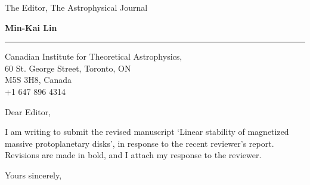 \documentclass{letter} %
\begin{document}
\signature{Min-Kai Lin}           %
\longindentation=0pt                       %
\let\raggedleft\raggedright                %
 
 
\begin{letter}{The Editor, The Astrophysical Journal}


\begin{flushleft}
{\large\bf Min-Kai Lin}
\end{flushleft}
\medskip\hrule height 1pt
\begin{flushright}
\hfill Canadian Institute for Theoretical Astrophysics, \\
\hfill 60 St. George Street, Toronto, ON \\
\hfill M5S 3H8, Canada\\
\hfill +1 647 896 4314
\end{flushright} 
\vfill %

 
\opening{Dear Editor,} 
 
I am writing to submit the revised manuscript `Linear stability of
magnetized massive protoplanetary disks', in response to the recent
reviewer's report. Revisions are made in bold, and I attach my
response to the reviewer.   

\closing{Yours sincerely,} 
 
 

\end{letter}
 
\end{document}
